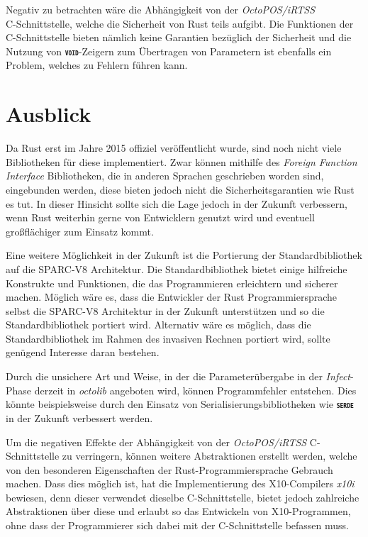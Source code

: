Negativ zu betrachten wäre die Abhängigkeit von der \textit{OctoPOS/iRTSS} \\
C-Schnittstelle,
welche die Sicherheit von Rust teils aufgibt. Die Funktionen der C-Schnittstelle bieten nämlich keine Garantien 
bezüglich der Sicherheit und die Nutzung von \texttt{\textsc{\textbf{void}}}-Zeigern zum Übertragen
von Parametern ist ebenfalls ein Problem, welches zu Fehlern führen kann.

\section{Ausblick}

Da Rust erst im Jahre 2015 offiziel veröffentlicht wurde, sind noch nicht viele Bibliotheken für diese implementiert.
Zwar können mithilfe des \textit{Foreign Function Interface} Bibliotheken,
die in anderen Sprachen geschrieben worden sind, eingebunden werden, diese bieten jedoch
nicht die Sicherheitsgarantien wie Rust es tut.
In dieser Hinsicht sollte sich die Lage jedoch in der Zukunft verbessern, wenn Rust
weiterhin gerne von Entwicklern genutzt wird und eventuell großflächiger zum Einsatz kommt.

Eine weitere Möglichkeit in der Zukunft ist die Portierung der Standardbibliothek auf die SPARC-V8 Architektur.
Die Standardbibliothek bietet einige hilfreiche Konstrukte und Funktionen,
die das Programmieren erleichtern und sicherer machen.
Möglich wäre es, dass die Entwickler der Rust Programmiersprache selbst die SPARC-V8 Architektur
in der Zukunft unterstützen und so die Standardbibliothek portiert wird. Alternativ wäre es möglich, dass die 
Standardbibliothek im Rahmen des invasiven Rechnen portiert wird, sollte genügend Interesse daran bestehen.

Durch die unsichere Art und Weise, in der die Parameterübergabe in der \textit{Infect}-Phase derzeit in
\textit{octolib} angeboten wird, können Programmfehler entstehen. Dies könnte beispielsweise durch den Einsatz von
Serialisierungsbibliotheken wie \texttt{\textsc{\textbf{serde}}} in der Zukunft verbessert werden.

Um die negativen Effekte der Abhängigkeit von der \textit{OctoPOS/iRTSS} C-Schnittstelle zu verringern,
können weitere Abstraktionen erstellt werden, welche von den
besonderen Eigenschaften der Rust-Programmiersprache Gebrauch machen.
Dass dies möglich ist, hat die Implementierung des X10-Compilers \textit{x10i} bewiesen,
denn dieser verwendet dieselbe C-Schnittstelle,
bietet jedoch zahlreiche Abstraktionen über diese und erlaubt so
das Entwickeln von X10-Programmen, ohne dass der Programmierer sich dabei mit der C-Schnittstelle befassen muss.
